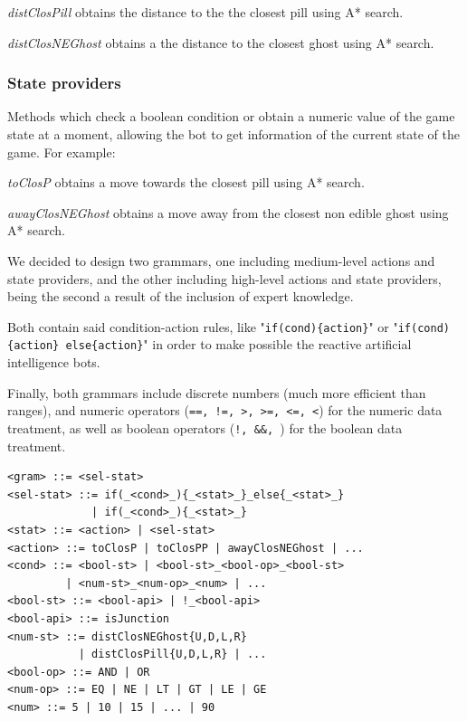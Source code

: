 \documentclass{llncs}
\newcommand\menostab[1][-0.5cm]{\hspace*{#1}}
\begin{document}
\menostab\textit{distClosPill} obtains the distance to the the closest pill using A* search.

\menostab\textit{distClosNEGhost} obtains a the distance to the closest ghost using A* search.

\subsubsection{State providers}
Methods which check a boolean condition or obtain a numeric value of the game state at a moment, allowing the bot to get information of the current state of the game. For example:\newline

\menostab\textit{toClosP} obtains a move towards the closest pill using A* search.

\menostab\textit{awayClosNEGhost} obtains a move away from the closest non edible ghost using A* search.\newline

We decided to design two grammars, one including medium-level actions and state providers, and the other including high-level actions and state providers, being the second a result of the inclusion of expert knowledge.

Both contain said condition-action rules, like "\texttt{if(cond)\{action\}}" or "\texttt{if(cond)\{action\} else\{action\}}" in order to make possible the reactive artificial intelligence bots.

Finally, both grammars include discrete numbers (much more efficient than ranges), and numeric operators (\texttt{==, !=, >, >=, <=, <}) for the numeric data treatment, as well as boolean operators (\texttt{!, \&\&, \textbar\textbar})  for the boolean data treatment. 

\begin{lstlisting}[frame=single, caption=medium-level grammar, breaklines=true, basicstyle=\fontsize{10}{11}\ttfamily]
<gram> ::= <sel-stat>
<sel-stat> ::= if(_<cond>_){_<stat>_}_else{_<stat>_}
             | if(_<cond>_){_<stat>_}
<stat> ::= <action> | <sel-stat>
<action> ::= toClosP | toClosPP | awayClosNEGhost | ...
<cond> ::= <bool-st> | <bool-st>_<bool-op>_<bool-st>
         | <num-st>_<num-op>_<num> | ...
<bool-st> ::= <bool-api> | !_<bool-api>
<bool-api> ::= isJunction
<num-st> ::= distClosNEGhost{U,D,L,R}
           | distClosPill{U,D,L,R} | ...
<bool-op> ::= AND | OR
<num-op> ::= EQ | NE | LT | GT | LE | GE
<num> ::= 5 | 10 | 15 | ... | 90
\end{lstlisting} %
\end{document}
